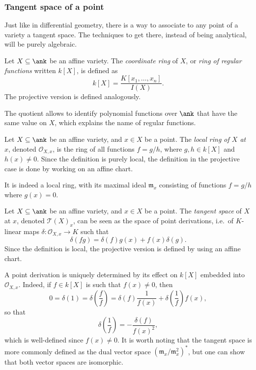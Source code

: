 \subsubsection{Tangent space of a point}\label{subsubsection:tangent}
Just like in differential geometry, there is a way to associate to any point of a variety a tangent space. The techniques to get there, instead of being analytical, will be purely algebraic.
\begin{defn}
    Let $X \subseteq \ank$ be an affine variety. The \emph{coordinate ring} of $X$, or \emph{ring of regular functions} written $k[X]$, is defined as
    \[k[X] = \frac{K[x_1, \ldots, x_n]}{I(X)}.\]
    The projective version is defined analogously.
\end{defn}
The quotient allows to identify polynomial functions over $\ank$ that have the same value on $X$, which explains the name of regular functions.

\begin{defn}
    Let $X \subseteq \ank$ be an affine variety, and $x \in X$ be a point. The \emph{local ring of $X$ at $x$}, denoted $\mathcal{O}_{X,x}$, is the ring of all functions $f = g/h$, where $g, h \in k[X]$ and $h(x) \neq 0$. Since the definition is purely local, the definition in the projective case is done by working on an affine chart.
\end{defn}
It is indeed a local ring, with its maximal ideal $\mathfrak{m}_x$ consisting of functions $f = g/h$ where $g(x) = 0$.

\begin{defn}
    Let $X \subseteq \ank$ be an affine variety, and $x \in X$ be a point. The \emph{tangent space} of $X$ at $x$, denoted $\mathcal{T}{(X)}_x$, can be seen as the space of point derivations, i.e.\ of $K$-linear maps $\delta : \mathcal{O}_{X,x} \to K$ such that 
    \[ \delta\left(fg\right) = \delta(f) g(x) + f(x) \delta(g). \]
    Since the definition is local, the projective version is defined by using an affine chart.
\end{defn}
A point derivation is uniquely determined by its effect on $k[X]$ embedded into $\mathcal{O}_{X,x}$. Indeed, if $f \in k[X]$ is such that $f(x) \neq 0$, then
\[ 0 = \delta\left(1\right) = \delta\left(\frac{f}{f}\right) = \delta(f) \frac{1}{f(x)} + \delta\left(\frac{1}{f}\right) f(x), \]
so that 
\[\delta\left(\frac{1}{f}\right) = - \frac{\delta(f)}{f{(x)}^2}, \]
which is well-defined since $f(x) \neq 0$. It is worth noting that the tangent space is more commonly defined as the dual vector space ${(\mathfrak{m}_x / \mathfrak{m}_x^2)}^*$, but one can show that both vector spaces are isomorphic.

